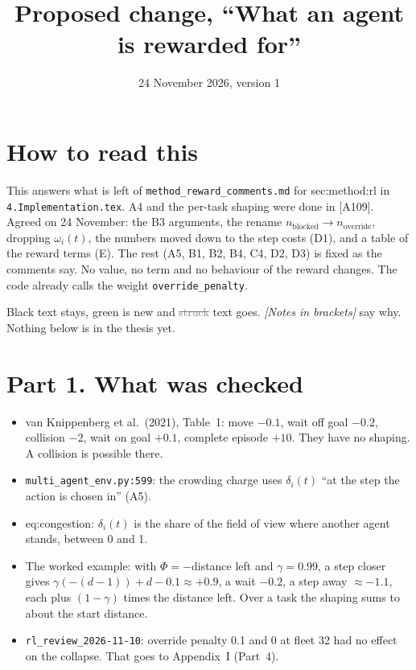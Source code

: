 \documentclass[11pt,a4paper]{article}
\title{Proposed change, ``What an agent is rewarded for''}
\date{24 November 2026, version 1}
\newcommand{\new}[1]{\textcolor{newc}{#1}}
\newcommand{\old}[1]{\textcolor{gray}{\sout{#1}}}
\newcommand{\note}[1]{{\small\itshape [#1]}}
\newcommand{\lab}[1]{\textsf{\footnotesize #1}}
\begin{document}
\sloppy
\maketitle

\section*{How to read this}
This answers what is left of \texttt{method\_reward\_comments.md} for
\lab{sec:method:rl} in \texttt{4.Implementation.tex}. A4 and the per-task
shaping were done in [A109]. Agreed on 24 November: the B3 arguments, the
rename $n_{\mathrm{blocked}} \to n_{\mathrm{override}}$, dropping
$\omega_i(t)$, the numbers moved down to the step costs (D1), and a table of
the reward terms (E). The rest (A5, B1, B2, B4, C4, D2, D3) is fixed as the
comments say. No value, no term and no behaviour of the reward changes. The
code already calls the weight \texttt{override\_penalty}.

Black text stays, \new{green} is new and \old{struck} text goes.
\note{Notes in brackets} say why. Nothing below is in the thesis yet.

\section*{Part 1. What was checked}
\begin{itemize}[nosep]
  \item van Knippenberg et al.\ (2021), Table~1: move $-0.1$, wait off goal
    $-0.2$, collision $-2$, wait on goal $+0.1$, complete episode $+10$. They
    have no shaping. A collision is possible there.
  \item \texttt{multi\_agent\_env.py:599}: the crowding charge uses
    $\delta_i(t)$ ``at the step the action is chosen in'' (A5).
  \item \lab{eq:congestion}: $\delta_i(t)$ is the share of the field of view
    where another agent stands, between 0 and 1.
  \item The worked example: with $\Phi = -$distance left and $\gamma = 0.99$,
    a step closer gives $\gamma(-(d-1)) + d - 0.1 \approx +0.9$, a wait
    $-0.2$, a step away $\approx -1.1$, each plus $(1-\gamma)$ times the
    distance left. Over a task the shaping sums to about the start distance.
  \item \texttt{rl\_review\_2026-11-10}: override penalty 0.1 and 0 at fleet 32
    had no effect on the collapse. That goes to Appendix~I (Part~4).
\end{itemize}
\end{document}
